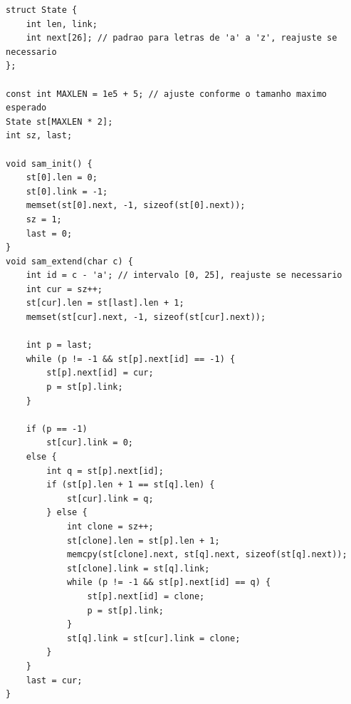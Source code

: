 \begin{lstlisting}
struct State {
    int len, link;
    int next[26]; // padrao para letras de 'a' a 'z', reajuste se necessario
};

const int MAXLEN = 1e5 + 5; // ajuste conforme o tamanho maximo esperado
State st[MAXLEN * 2];
int sz, last;

void sam_init() {
    st[0].len = 0;
    st[0].link = -1;
    memset(st[0].next, -1, sizeof(st[0].next));
    sz = 1;
    last = 0;
}
void sam_extend(char c) {
    int id = c - 'a'; // intervalo [0, 25], reajuste se necessario
    int cur = sz++;
    st[cur].len = st[last].len + 1;
    memset(st[cur].next, -1, sizeof(st[cur].next));
    
    int p = last;
    while (p != -1 && st[p].next[id] == -1) {
        st[p].next[id] = cur;
        p = st[p].link;
    }
    
    if (p == -1)
        st[cur].link = 0;
    else {
        int q = st[p].next[id];
        if (st[p].len + 1 == st[q].len) {
            st[cur].link = q;
        } else {
            int clone = sz++;
            st[clone].len = st[p].len + 1;
            memcpy(st[clone].next, st[q].next, sizeof(st[q].next)); 
            st[clone].link = st[q].link;
            while (p != -1 && st[p].next[id] == q) {
                st[p].next[id] = clone;
                p = st[p].link;
            }
            st[q].link = st[cur].link = clone;
        }
    }
    last = cur;
}
\end{lstlisting}